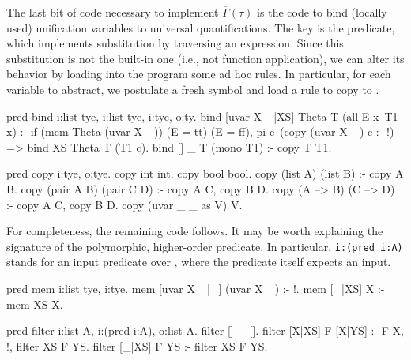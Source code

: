 \documentclass[a4paper, 11pt]{book}
\begin{document}
\noindent
The last bit of code necessary to implement $\overline{\Gamma}(\tau)$ is the
code to bind (locally used) unification variables to universal
quantifications. The key is the  predicate, which implements
substitution by traversing an expression. Since this substitution is not
the built-in one (i.e., not function application), we can alter its behavior
by loading into the program some ad hoc rules. In particular, for
each variable  to abstract, we postulate a fresh symbol
 and load a rule to copy  to .

\begin{elpicode}
pred bind i:list tye, i:list tye, i:tye, o:ty.
bind [uvar X _|XS] Theta T (all E x\ T1 x) :- %
  if (mem Theta (uvar X _)) (E = tt) (E = ff),
  pi c\ (copy (uvar X _) c :- !) => bind XS Theta T (T1 c).
bind [] _ T (mono T1) :- copy T T1. %

pred copy i:tye, o:tye.
copy int int.
copy bool bool.
copy (list A) (list B) :- copy A B.
copy (pair A B) (pair C D) :- copy A C, copy B D.
copy (A --> B) (C --> D) :- copy A C, copy B D.
copy (uvar _ _ as V) V.
\end{elpicode}

\noindent
For completeness, the remaining code follows. It may be worth explaining the
signature of the polymorphic, higher-order  predicate. In
particular, \texttt{i:(pred i:A)} stands for an input predicate over
, where the predicate itself expects an input.

\begin{elpicode}
pred mem i:list tye, i:tye.
mem [uvar X _|_] (uvar X _) :- !.
mem [_|XS] X :- mem XS X.
 
pred filter i:list A, i:(pred i:A), o:list A.
filter [] _ [].
filter [X|XS] F [X|YS] :- F X, !, filter XS F YS.
filter [_|XS] F YS :- filter XS F YS.
\end{elpicode}
\end{document}
